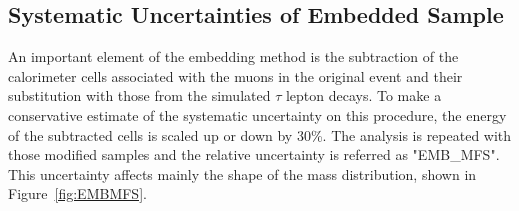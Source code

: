 

%


\subsection{Systematic Uncertainties of  \Ztautau Embedded Sample}\label{sec:embsys}

An important element of the embedding method is the subtraction of the 
calorimeter cells associated with the muons in the original \Zmumu event and their substitution with those from the simulated $\tau$ lepton
decays. To make a conservative estimate of the systematic uncertainty on this procedure, 
the energy of the subtracted cells is scaled up or down by 30\%. The analysis is repeated with those modified 
samples and the relative uncertainty is referred as "EMB\_MFS". This uncertainty affects mainly the shape of the \mmc mass 
distribution, shown in Figure~\ref{fig:EMBMFS}.


